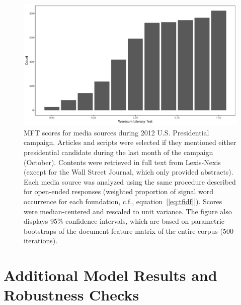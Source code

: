 \documentclass[12pt]{article}
\begin{document}
\begin{figure}[ht]\centering
\includegraphics[width=\textwidth]{../calc/fig/media_desc.pdf}
\caption{MFT scores for media sources during 2012 U.S. Presidential campaign. Articles and scripts were selected if they mentioned either presidential candidate during the last month of the campaign (October). Contents were retrieved in full text from Lexis-Nexis (except for the Wall Street Journal, which only provided abstracts). Each media source was analyzed using the same procedure described for open-ended responses (weighted proportion of signal word occurrence for each foundation, c.f., equation~[\ref{eq:tfidf}]). Scores were median-centered and rescaled to unit variance. The figure also displays 95\% confidence intervals, which are based on parametric bootstraps of the document feature matrix of the entire corpus (500 iterations).}\label{fig:media_desc}
\end{figure}




\clearpage
\section{Additional Model Results and Robustness Checks}\label{app:robust}
\renewcommand\thefigure{\thesection.\arabic{figure}}
\renewcommand\thetable{\thesection.\arabic{table}}
\setcounter{figure}{0}
\setcounter{table}{0}
\end{document}
